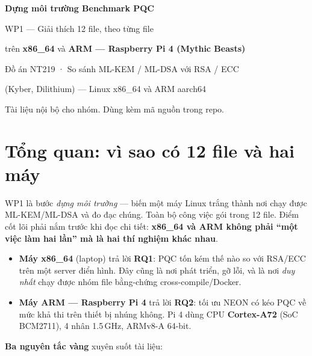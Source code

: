 \documentclass[11pt,a4paper]{article}
\begin{document}
\begin{titlepage}
\centering
\vspace*{2.5cm}
{\Huge\bfseries\color{accent} Dựng môi trường Benchmark PQC\par}
\vspace{0.6cm}
{\Large WP1 — Giải thích 12 file, theo từng file\par}
\vspace{0.3cm}
{\large trên \textbf{x86\_64} và \textbf{ARM — Raspberry Pi 4 (Mythic Beasts)}\par}
\vspace{1.2cm}
{\large Đồ án NT219 · So sánh ML-KEM / ML-DSA với RSA / ECC\par}
\vspace{0.2cm}
{\normalsize (Kyber, Dilithium) — Linux x86\_64 và ARM aarch64\par}
\vfill
{\small Tài liệu nội bộ cho nhóm. Dùng kèm mã nguồn trong repo.\par}
\vspace{0.5cm}
\end{titlepage}

\tableofcontents
\newpage

\section{Tổng quan: vì sao có 12 file và hai máy}

WP1 là bước \emph{dựng môi trường} — biến một máy Linux trắng thành nơi chạy được ML-KEM/ML-DSA và đo đạc chúng. Toàn bộ công việc gói trong 12 file. Điểm cốt lõi phải nắm trước khi đọc chi tiết: \textbf{x86\_64 và ARM không phải ``một việc làm hai lần'' mà là hai thí nghiệm khác nhau}.

\begin{itemize}
  \item \textbf{Máy x86\_64} (laptop) trả lời \textbf{RQ1}: PQC tốn kém thế nào so với RSA/ECC trên một server điển hình. Đây cũng là nơi phát triển, gỡ lỗi, và là nơi \emph{duy nhất} chạy được nhóm file bằng-chứng cross-compile/Docker.
  \item \textbf{Máy ARM — Raspberry Pi 4} trả lời \textbf{RQ2}: tối ưu NEON có kéo PQC về mức khả thi trên thiết bị nhúng không. Pi 4 dùng CPU \textbf{Cortex-A72} (SoC BCM2711), 4 nhân 1.5\,GHz, ARMv8-A 64-bit.
\end{itemize}

\textbf{Ba nguyên tắc vàng} xuyên suốt tài liệu:
\end{document}
